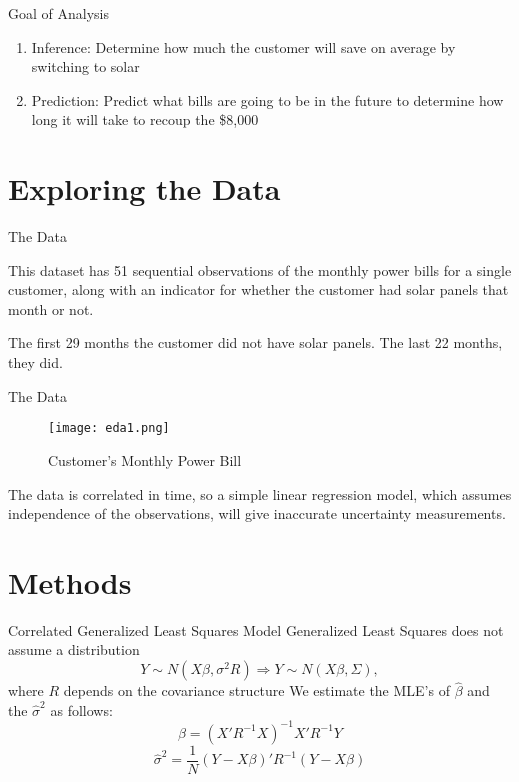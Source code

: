\documentclass[10pt]{beamer}
\begin{document}
\begin{frame}{Goal of Analysis}
\begin{enumerate}
\item Inference: Determine how much the customer will save on average by switching to solar
\item Prediction: Predict what bills are going to be in the future to determine how long it will take to recoup the \$8,000
\end{enumerate}
\end{frame}

\section{Exploring the Data}

\begin{frame}{The Data}
\itemize
\item This dataset has 51 sequential observations of the monthly power bills for a single customer, along with an indicator for whether the customer had solar panels that month or not. 
\item The first 29 months the customer did not have solar panels. The last 22 months, they did.
\end{frame}

\begin{frame}{The Data}
\begin{figure}
\begin{center}
\caption{Customer's Monthly Power Bill}
\texttt{[image: eda1.png]}
\label{splot}
\smallskip
\end{center}
\end{figure} 
The data is correlated in time, so a simple linear regression model, which assumes independence of the observations, will give inaccurate uncertainty measurements.
\end{frame}

\section{Methods}

\begin{frame}{Correlated Generalized Least Squares Model}
Generalized Least Squares does not assume a distribution
\begin{equation}
Y \sim N(X\beta,\sigma^2R) \Rightarrow Y \sim N(X\beta,\Sigma) ,
\end{equation}
where $R$ depends on the covariance structure
\smallskip
We estimate the MLE's of $\hat{\beta}$ and the $\hat{\sigma}^2$ as follows:
\begin{equation}
\hat{\beta} = (X'R^{-1}X)^{-1}X'R^{-1}Y
\end{equation}
\begin{equation}
\hat{\sigma}^2=\frac{1}{N}(Y-X\beta)'R^{-1}(Y-X\beta)
\end{equation}
\end{frame}
\end{document}
